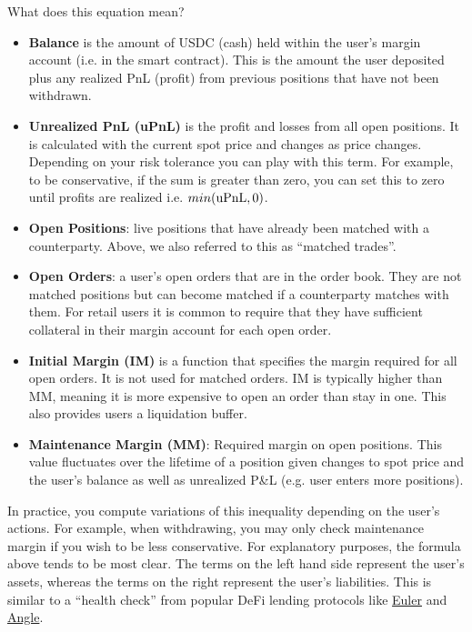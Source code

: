 \documentclass{article}
\begin{document}
\noindent What does this equation mean?
\begin{itemize}
    \item \textbf{Balance} is the amount of USDC (cash) held within the user's margin account (i.e. in the smart contract). This is the amount the user deposited plus any realized PnL (profit) from previous positions that have not been withdrawn.
    \item \textbf{Unrealized PnL (uPnL)} is the profit and losses from all open positions. It is calculated with the current spot price and changes as price changes. Depending on your risk tolerance you can play with this term. For example, to be conservative, if the sum is greater than zero, you can set this to zero until profits are realized i.e. $min(\textup{uPnL}, 0)$. 
    \item \textbf{Open Positions}: live positions that have already been matched with a counterparty. Above, we also referred to this as ``matched trades''.
    \item \textbf{Open Orders}: a user's open orders that are in the order book. They are not matched positions but can become matched if a counterparty matches with them. For retail users it is common to require that they have sufficient collateral in their margin account for each open order.
    \item \textbf{Initial Margin (IM)} is a function that specifies the margin required for all open  orders. It is not used for matched orders. IM is typically higher than MM, meaning it is more expensive to open an order than stay in one. This also provides users a liquidation buffer. 
    \item \textbf{Maintenance Margin (MM)}: Required margin on open positions. This value fluctuates over the lifetime of a position given changes to spot price and the user's balance as well as unrealized P&L (e.g. user enters more positions). 
\end{itemize}

\noindent In practice, you compute variations of this inequality depending on the user's actions. For example, when withdrawing, you may only check maintenance margin if you wish to be less conservative. For explanatory purposes, the formula above tends to be most clear. The terms on the left hand side represent the user's assets, whereas the terms on the right represent the user's liabilities. This is similar to a ``health check'' from popular DeFi lending protocols like \href{https://docs.euler.finance/getting-started/white-paper#liquidations}{Euler} and \href{https://docs.angle.money/angle-borrowing-module/vaults/liquidations}{Angle}. 
  
\end{document}
